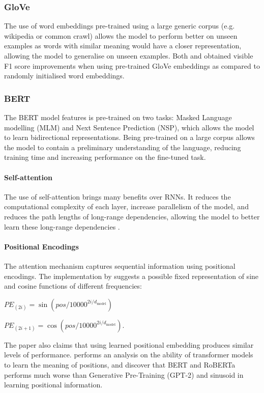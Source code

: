 \documentclass[a4paper]{article}
\begin{document}
\begin{multicols}{2}
\subsubsection{GloVe}
The use of word embeddings pre-trained using a large generic corpus (e.g. wikipedia or common crawl) allows the model to perform better on unseen examples as words with similar meaning would have a closer representation, allowing the model to generalise on unseen examples.
Both \citet{birnnattention} and \citet{kim_2019} obtained visible F1 score improvements when using pre-trained GloVe \citep{glove} embeddings as compared to randomly initialised word embeddings. 
\subsubsection{BERT}
The BERT model features is pre-trained on two tasks: Masked Language modelling (MLM) and Next Sentence Prediction (NSP), which allows the model to learn bidirectional representations. Being pre-trained on a large corpus allows the model to contain a preliminary understanding of the language, reducing training time and increasing performance on the fine-tuned task.
\paragraph{Self-attention}
The use of self-attention brings many benefits over RNNs. It reduces the computational complexity of each layer, increase parallelism of the model, and reduces the path lengths of long-range dependencies, allowing the model to better learn these long-range dependencies \citep{attentionisallyouneed}.
\paragraph{Positional Encodings}
The attention mechanism captures sequential information using positional encodings. The implementation by \cite{attentionisallyouneed} suggests a possible fixed representation of sine and cosine functions of different frequencies: 

$PE_{(2i)} = \sin{(pos/10000^{2i/d_{\text{model}}})}$

$PE_{(2i+1)} = \cos{(pos/10000^{2i/d_{\text{model}}})}$. 

The paper also claims that using learned positional embedding produces similar levels of performance. \cite{positionembedding} performs an analysis on the ability of transformer models to learn the meaning of positions, and discover that BERT and RoBERTa performs much worse than Generative Pre-Training (GPT-2) and sinusoid in learning positional information.


\end{multicols}
\end{document}

